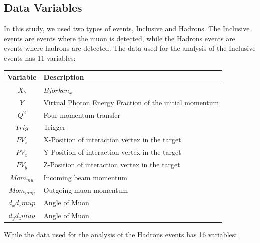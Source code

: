 \documentclass{article}
\begin{document}
\subsection{Data Variables}
In this study, we used two types of events, Inclusive and Hadrons. The Inclusive events are events where the muon is detected, while the Hadrons events are events where hadrons are detected.
The data used for the analysis of the Inclusive events has 11 variables:

\begin{table}[H]
    \centering
    \begin{tabular}{c|l}
    \textbf{Variable} & \textbf{Description} \\ \hline
    $X_b$ & $Bjorken_x$ \\
    $Y$ & Virtual Photon Energy Fraction of the initial momentum\\
    $Q^2$ & Four-momentum transfer \\
    $Trig$ & Trigger \\
    $PV_z$ & X-Position of interaction vertex in the target\\
    $PV_x$ & Y-Position of interaction vertex in the target\\
    $PV_y$ & Z-Position of interaction vertex in the target\\
    $Mom_{mu}$ & Incoming beam momentum\\
    $Mom_{mup}$ & Outgoing muon momentum\\
    $d_xd_zmup$ & Angle of Muon \\
    $d_{y}d_{z}mup$ & Angle of Muon \\
    \end{tabular}
\end{table}

While the data used for the analysis of the Hadrons events has 16 variables:
\end{document}
